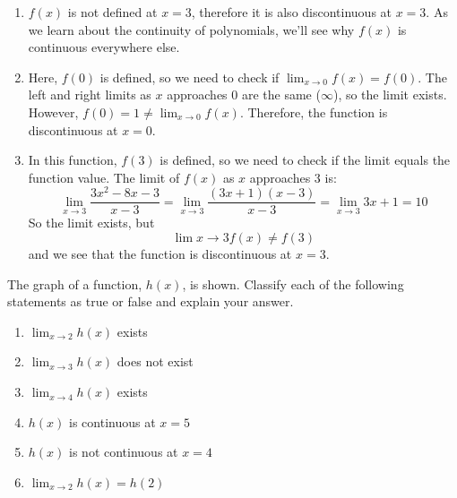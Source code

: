 \begin{Answer}[ref=limits5]
    \begin{enumerate}
    \item $f(x)$ is not defined at $x = 3$, therefore it is also discontinuous at $x = 3$. As we learn about the continuity of polynomials, we'll see why $f(x)$ is continuous everywhere else. 
    \item Here, $f(0)$ is defined, so we need to check if $\lim_{x \to 0}f(x) = f(0)$. The left and right limits as $x$ approaches $0$ are the same ($\infty$), so the limit exists. However, $f(0) = 1 \neq \lim_{x\to 0}f(x)$. Therefore, the function is discontinuous at $x=0$.
    \item In this function, $f(3)$ is defined, so we need to check if the limit equals the function value. The limit of $f(x)$ as $x$ approaches $3$ is: $$\lim_{x \to 3}\frac{3x^2-8x-3}{x-3} = \lim_{x \to 3}\frac{(3x+1)(x-3)}{x-3} = \lim_{x \to 3}3x+1 = 10$$ So the limit exists, but $$\lim{x \to 3}f(x) \neq f(3)$$ and we see that the function is discontinuous at $x=3$.
	\end{enumerate}
\end{Answer}

\begin{Exercise}[label=limits6]
	The graph of a function, $h(x)$, is shown. Classify each of the following statements as true or false and explain your answer. 
	\\
	\begin{enumerate}
	\item $\lim_{x\to2} h(x)$ exists
	\item $\lim_{x \to 3} h(x)$ does not exist
	\item $\lim_{x \to 4} h(x)$ exists
	\item $h(x)$ is continuous at $x=5$
	\item $h(x)$ is not continuous at $x=4$
	\item $\lim_{x \to 2} h(x) = h(2)$
	\end{enumerate}
\end{Exercise}

